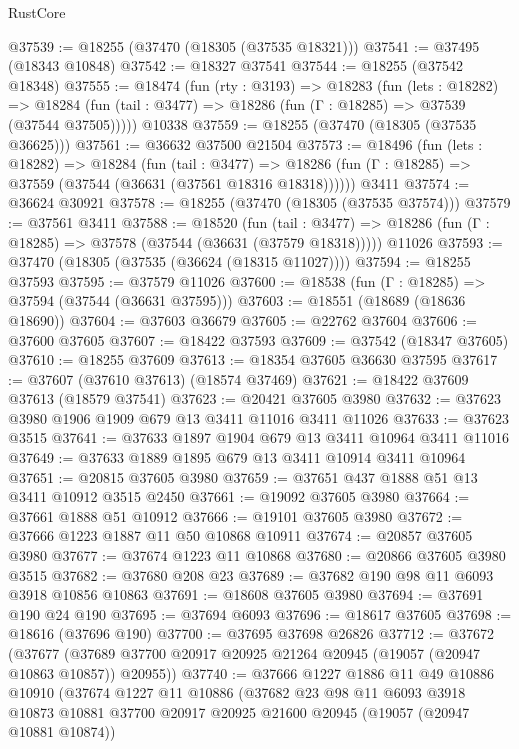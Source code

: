 \begin{lexlean}{RustCore}
\begin{coremodule}
@37539 := @18255 (@37470 (@18305 (@37535 @18321)))
@37541 := @37495 (@18343 @10848)
@37542 := @18327 @37541
@37544 := @18255 (@37542 @18348)
@37555 := @18474
    (fun (rty : @3193) =>
    @18283
      (fun (lets : @18282) =>
      @18284 (fun (tail : @3477) => @18286 (fun (Γ : @18285) => @37539 (@37544 @37505)))))
    @10338
@37559 := @18255 (@37470 (@18305 (@37535 @36625)))
@37561 := @36632 @37500 @21504
@37573 := @18496
    (fun (lets : @18282) =>
    @18284
      (fun (tail : @3477) =>
      @18286 (fun (Γ : @18285) => @37559 (@37544 (@36631 (@37561 @18316 @18318))))))
    @3411
@37574 := @36624 @30921
@37578 := @18255 (@37470 (@18305 (@37535 @37574)))
@37579 := @37561 @3411
@37588 := @18520
    (fun (tail : @3477) => @18286 (fun (Γ : @18285) => @37578 (@37544 (@36631 (@37579 @18318)))))
    @11026
@37593 := @37470 (@18305 (@37535 (@36624 (@18315 @11027))))
@37594 := @18255 @37593
@37595 := @37579 @11026
@37600 := @18538 (fun (Γ : @18285) => @37594 (@37544 (@36631 @37595)))
@37603 := @18551 (@18689 (@18636 @18690))
@37604 := @37603 @36679
@37605 := @22762 @37604
@37606 := @37600 @37605
@37607 := @18422 @37593
@37609 := @37542 (@18347 @37605)
@37610 := @18255 @37609
@37613 := @18354 @37605 @36630 @37595
@37617 := @37607 (@37610 @37613) (@18574 @37469)
@37621 := @18422 @37609 @37613 (@18579 @37541)
@37623 := @20421 @37605 @3980
@37632 := @37623 @3980 @1906 @1909 @679 @13 @3411 @11016 @3411 @11026
@37633 := @37623 @3515
@37641 := @37633 @1897 @1904 @679 @13 @3411 @10964 @3411 @11016
@37649 := @37633 @1889 @1895 @679 @13 @3411 @10914 @3411 @10964
@37651 := @20815 @37605 @3980
@37659 := @37651 @437 @1888 @51 @13 @3411 @10912 @3515 @2450
@37661 := @19092 @37605 @3980
@37664 := @37661 @1888 @51 @10912
@37666 := @19101 @37605 @3980
@37672 := @37666 @1223 @1887 @11 @50 @10868 @10911
@37674 := @20857 @37605 @3980
@37677 := @37674 @1223 @11 @10868
@37680 := @20866 @37605 @3980 @3515
@37682 := @37680 @208 @23
@37689 := @37682 @190 @98 @11 @6093 @3918 @10856 @10863
@37691 := @18608 @37605 @3980
@37694 := @37691 @190 @24 @190
@37695 := @37694 @6093
@37696 := @18617 @37605
@37698 := @18616 (@37696 @190)
@37700 := @37695 @37698 @26826
@37712 := @37672
    (@37677 (@37689 @37700 @20917 @20925 @21264 @20945 (@19057 (@20947 @10863 @10857)) @20955))
@37740 := @37666
    @1227
    @1886
    @11
    @49
    @10886
    @10910
    (@37674
      @1227
      @11
      @10886
      (@37682
        @23
        @98
        @11
        @6093
        @3918
        @10873
        @10881
        @37700
        @20917
        @20925
        @21600
        @20945
        (@19057 (@20947 @10881 @10874))

\end{coremodule}
\end{lexlean}
